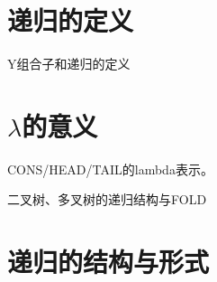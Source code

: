 \documentclass[UTF8]{article}
\begin{document}
\section{递归的定义}

Y组合子和递归的定义




\section{$\lambda$的意义}

CONS/HEAD/TAIL的lambda表示。

二叉树、多叉树的递归结构与FOLD

\section{递归的结构与形式}

\end{document}
